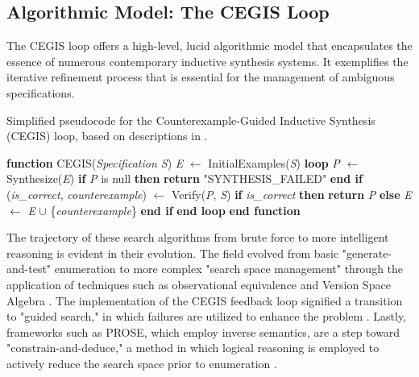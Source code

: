 \documentclass[12pt, a4paper]{report}
\begin{document}
\subsection{Algorithmic Model: The CEGIS Loop}

The CEGIS loop offers a high-level, lucid algorithmic model that encapsulates the essence of numerous contemporary inductive synthesis systems.  It exemplifies the iterative refinement process that is essential for the management of ambiguous specifications.

\begin{algorithm}
\caption{Simplified pseudocode for the Counterexample-Guided Inductive Synthesis (CEGIS) loop, based on descriptions in \citep{solar2008sketch, alur2013syntax}.}
\label{alg:cegis}
\begin{algorithmic}[1]
\STATE \textbf{function} CEGIS(\textit{Specification S})
\STATE \quad \textit{E} $\leftarrow$ InitialExamples(\textit{S}) 
\STATE \quad \textbf{loop}
\STATE \quad \quad \textit{P} $\leftarrow$ Synthesize(\textit{E}) 
\STATE \quad \quad \textbf{if} \textit{P} is null \textbf{then}
\STATE \quad \quad \quad \textbf{return} "SYNTHESIS\_FAILED"
\STATE \quad \quad \textbf{end if}
\STATE \quad \quad (\textit{is\_correct}, \textit{counterexample}) $\leftarrow$ Verify(\textit{P}, \textit{S}) 
\STATE \quad \quad \textbf{if} \textit{is\_correct} \textbf{then}
\STATE \quad \quad \quad \textbf{return} \textit{P} 
\STATE \quad \quad \textbf{else}
\STATE \quad \quad \quad \textit{E} $\leftarrow$ \textit{E} $\cup$ \{\textit{counterexample}\} 
\STATE \quad \quad \textbf{end if}
\STATE \quad \textbf{end loop}
\STATE \textbf{end function}
\end{algorithmic}
\end{algorithm}

The trajectory of these search algorithms from brute force to more intelligent reasoning is evident in their evolution.  The field evolved from basic "generate-and-test" enumeration to more complex "search space management" through the application of techniques such as observational equivalence and Version Space Algebra \citep{gulwani2011automating, udupa2013transit}.  The implementation of the CEGIS feedback loop signified a transition to "guided search," in which failures are utilized to enhance the problem \citep{solar2008sketch}.  Lastly, frameworks such as PROSE, which employ inverse semantics, are a step toward "constrain-and-deduce," a method in which logical reasoning is employed to actively reduce the search space prior to enumeration \citep{polozov2015flashmeta}.
\end{document}

